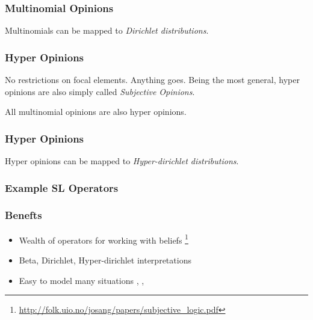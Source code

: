 \documentclass{beamer}
\begin{document}

\begin{frame}
\frametitle{Multinomial Opinions}

Multinomials can be mapped to \emph{Dirichlet distributions}.

\end{frame}



\begin{frame}
\frametitle{Hyper Opinions}

No restrictions on focal elements. Anything goes. Being the most general, hyper
opinions are also simply called \emph{Subjective Opinions}.

All multinomial opinions are also hyper opinions.

\end{frame}


\begin{frame}
\frametitle{Hyper Opinions}

Hyper opinions can be mapped to \emph{Hyper-dirichlet distributions}.

\end{frame}



\begin{frame}
\frametitle{Example SL Operators}


\end{frame}


\begin{frame}
\frametitle{Benefts}

\begin{itemize}
  \item Wealth of operators for working with beliefs
     \footnote{\url{http://folk.uio.no/josang/papers/subjective_logic.pdf}}
  \item Beta, Dirichlet, Hyper-dirichlet interpretations
  \item Easy to model many situations
    \cite{josang2008conditional}, \cite{josang2006trust}, \cite{kent2010application}
\end{itemize}

\end{frame}
\end{document}
